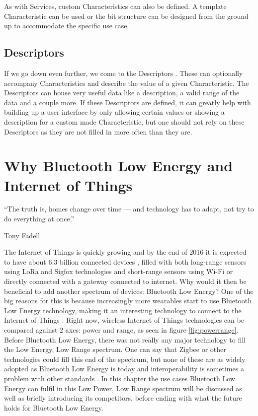 \documentclass[pdftex,a4paper,12pt,twoside]{report}
\begin{document}
As with Services, custom Characteristics can also be defined. A template Characteristic can be used or the bit structure can be designed from the ground up to accommodate the specific use case.

\section{Descriptors}
\label{sec:descriptors}
If we go down even further, we come to the Descriptors \citep{heydon2012bluetooth}. These can optionally accompany Characteristics and describe the value of a given Characteristic. The Descriptors can house very useful data like a description, a valid range of the data and a couple more. If these Descriptors are defined, it can greatly help with building up a user interface by only allowing certain values or showing a description for a custom made Characteristic, but one should not rely on these Descriptors as they are not filled in more often than they are.

\chapter{Why Bluetooth Low Energy and Internet of Things}
\label{ch:BLEIOT}
\epigraph{``The truth is, homes change over time — and technology has to adapt, not try to do everything at once.''}{Tony Fadell}
The Internet of Things is quickly growing and by the end of 2016 it is expected to have about 6.3 billion connected devices \citep{gartner2015}, filled with both long-range sensors using LoRa and Sigfox technologies and short-range sensors using Wi-Fi or directly connected with a gateway connected to internet. Why would it then be beneficial to add another spectrum of devices: Bluetooth Low Energy? One of the big reasons for this is because increasingly more wearables start to use Bluetooth Low Energy technology, making it an interesting technology to connect to the Internet of Things \citep{wei2014wearables}. Right now, wireless Internet of Things technologies can be compared against 2 axes: power and range, as seen in figure \ref{fig:powerrange}. Before Bluetooth Low Energy, there was not really any major technology to fill the Low Energy, Low Range spectrum. One can say that Zigbee or other technologies could fill this end of the spectrum, but none of these are as widely adopted as Bluetooth Low Energy is today and interoperability is sometimes a problem with other standards \citep{colitti2014}. In this chapter the use cases Bluetooth Low Energy can fulfil in this Low Power, Low Range spectrum will be discussed as well as briefly introducing its competitors, before ending with what the future holds for Bluetooth Low Energy.
\end{document}
